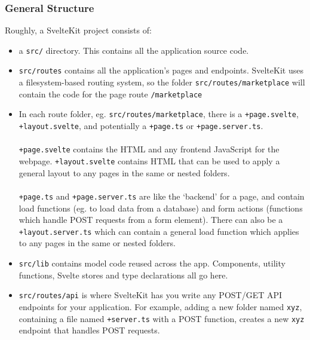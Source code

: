 \documentclass[12pt,a4paper]{article}
\begin{document}
\subsubsection{General Structure}
Roughly, a SvelteKit project consists of:
\begin{itemize}
    \item a \verb|src/| directory. This contains all the application source code.
    \item \verb|src/routes| contains all the application's pages and endpoints. SvelteKit uses a filesystem-based routing system, so the folder \verb|src/routes/marketplace| will contain the code for the page route \verb|/marketplace|
    \item In each route folder, eg. \verb|src/routes/marketplace|, there is a \verb|+page.svelte|, \verb|+layout.svelte|, and potentially a \verb|+page.ts| or \verb|+page.server.ts|.\\\\ \verb|+page.svelte| contains the HTML and any frontend JavaScript for the webpage. \verb|+layout.svelte| contains HTML that can be used to apply a general layout to any pages in the same or nested folders. \\\\\verb|+page.ts| and \verb|+page.server.ts| are like the `backend' for a page, and contain load functions (eg. to load data from a database) and form actions (functions which handle POST requests from a form element). There can also be a \verb|+layout.server.ts| which can contain a general load function which applies to any pages in the same or nested folders.
    \item \verb|src/lib| contains model code reused across the app. Components, utility functions, Svelte stores and type declarations all go here.
    \item \verb|src/routes/api| is where SvelteKit has you write any POST/GET API endpoints for your application. For example, adding a new folder named \verb|xyz|, containing a file named \verb|+server.ts| with a POST function, creates a new \verb|xyz| endpoint that handles POST requests.
\end{itemize}
\end{document}

